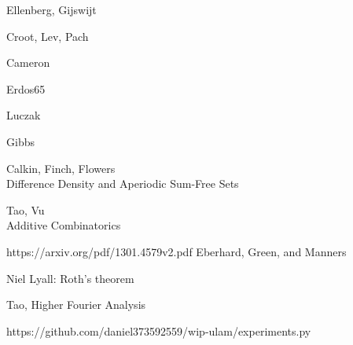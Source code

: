 \documentclass{article}
\theoremstyle{definition}
\theoremstyle{remark}
\numberwithin{equation}{section}
\begin{document}
{\begin{thebibliography}{9}
Ellenberg, Gijswijt

Croot, Lev, Pach

Cameron

Erdos65

Luczak

Gibbs

Calkin, Finch, Flowers\\
Difference Density and Aperiodic Sum-Free Sets 

Tao, Vu\\
Additive Combinatorics

  https://arxiv.org/pdf/1301.4579v2.pdf Eberhard, Green, and Manners

  Niel Lyall: Roth's theorem 

  Tao, Higher Fourier Analysis

  https://github.com/daniel373592559/wip-ulam/experiments.py

\end{thebibliography}

}
\end{document}
